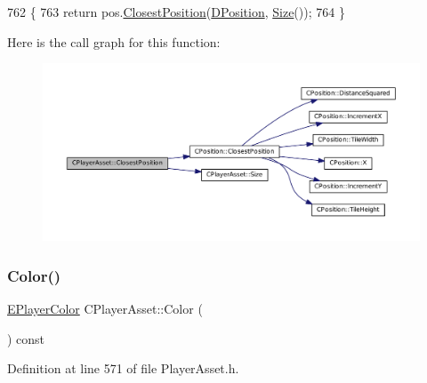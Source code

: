 \begin{DoxyCode}
762                                                                  \{
763     \textcolor{keywordflow}{return} pos.\hyperlink{classCPosition_a91fd43eeb2c894bcb7577ae87247b726}{ClosestPosition}(\hyperlink{classCPlayerAsset_aa9f53c009b181c7c5647c6b03776a04c}{DPosition}, \hyperlink{classCPlayerAsset_a85a9e2ce62f557e93219676117159fec}{Size}());
764 \}
\end{DoxyCode}
Here is the call graph for this function\+:
\nopagebreak
\begin{figure}[H]
\begin{center}
\leavevmode
\includegraphics[width=350pt]{classCPlayerAsset_a67e700ce77122894c02da584dd652767_cgraph}
\end{center}
\end{figure}
\hypertarget{classCPlayerAsset_a969e6e60c6343186d2b9a6cddd6654f8}{}\label{classCPlayerAsset_a969e6e60c6343186d2b9a6cddd6654f8} 
\subsubsection{\texorpdfstring{Color()}{Color()}}
{\footnotesize\ttfamily \hyperlink{GameDataTypes_8h_aafb0ca75933357ff28a6d7efbdd7602f}{E\+Player\+Color} C\+Player\+Asset\+::\+Color (\begin{DoxyParamCaption}{ }\end{DoxyParamCaption}) const\hspace{0.3cm}{\ttfamily [inline]}}



Definition at line 571 of file Player\+Asset.\+h.


